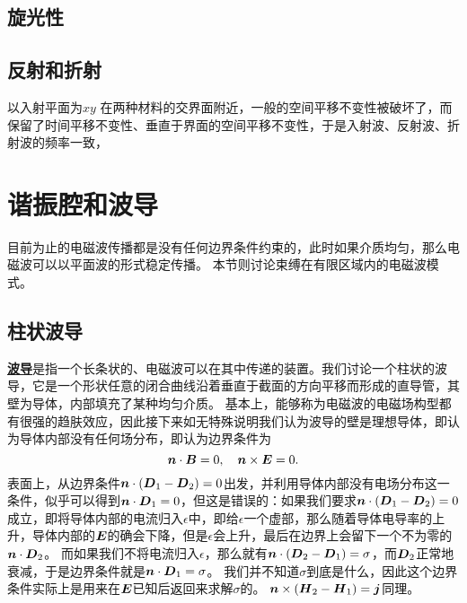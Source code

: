 \documentclass[UTF8, a4paper]{ctexart}
\newcommand*{\concept}[1]{\underline{\textbf{#1}}}
\begin{document}
\subsection{旋光性}

\subsection{反射和折射}

以入射平面为$xy$
在两种材料的交界面附近，一般的空间平移不变性被破坏了，而保留了时间平移不变性、垂直于界面的空间平移不变性，于是入射波、反射波、折射波的频率一致，

\section{谐振腔和波导}

目前为止的电磁波传播都是没有任何边界条件约束的，此时如果介质均匀，那么电磁波可以以平面波的形式稳定传播。
本节则讨论束缚在有限区域内的电磁波模式。

\subsection{柱状波导}

\concept{波导}是指一个长条状的、电磁波可以在其中传递的装置。我们讨论一个柱状的波导，它是一个形状任意的闭合曲线沿着垂直于截面的方向平移而形成的直导管，其壁为导体，内部填充了某种均匀介质。
基本上，能够称为电磁波的电磁场构型都有很强的趋肤效应，因此接下来如无特殊说明我们认为波导的壁是理想导体，即认为导体内部没有任何场分布，即认为边界条件为
\begin{equation}
    \vb*{n} \cdot \vb*{B} = 0, \quad \vb*{n} \times \vb*{E} = 0.
\end{equation}
表面上，从边界条件$\vb*{n} \cdot (\vb*{D}_1 - \vb*{D}_2) = 0$出发，并利用导体内部没有电场分布这一条件，似乎可以得到$\vb*{n} \cdot \vb*{D}_1=0$，但这是错误的：如果我们要求$\vb*{n} \cdot (\vb*{D}_1 - \vb*{D}_2) = 0$成立，即将导体内部的电流归入$\epsilon$中，即给$\epsilon$一个虚部，那么随着导体电导率的上升，导体内部的$\vb*{E}$的确会下降，但是$\epsilon$会上升，最后在边界上会留下一个不为零的$\vb*{n} \cdot \vb*{D}_2$。
而如果我们不将电流归入$\epsilon$，那么就有$\vb*{n} \cdot (\vb*{D}_2 - \vb*{D}_1) = \sigma$，而$\vb*{D}_2$正常地衰减，于是边界条件就是$\vb*{n} \cdot \vb*{D}_1 = \sigma$。
我们并不知道$\sigma$到底是什么，因此这个边界条件实际上是用来在$\vb*{E}$已知后返回来求解$\sigma$的。
$\vb*{n} \times (\vb*{H}_2 - \vb*{H}_1) = \vb*{j}$同理。
\end{document}
